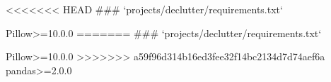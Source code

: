 <<<<<<< HEAD
### `projects/declutter/requirements.txt`

Pillow>=10.0.0
=======
### `projects/declutter/requirements.txt`

Pillow>=10.0.0
>>>>>>> a59f96d314b16ed3fee32f14bc2134d7d74aef6a
pandas>=2.0.0